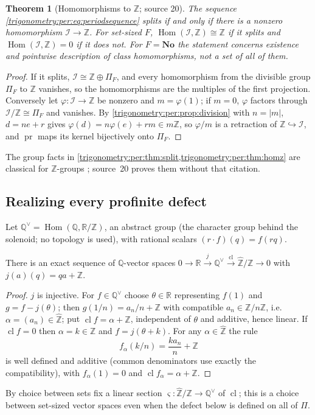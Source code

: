 \documentclass[11pt,letterpaper]{article}
\numberwithin{equation}{section}
\newtheorem{theorem}{Theorem}[section]
\theoremstyle{definition}
\theoremstyle{remark}
\newcommand{\No}{\mathbf{No}}
\newcommand{\R}{\mathbb R}
\newcommand{\Q}{\mathbb Q}
\newcommand{\Z}{\mathbb Z}
\newcommand{\Hom}{\operatorname{Hom}}
\newcommand{\pr}{\operatorname{pr}}
\newcommand{\cl}{\operatorname{cl}}
\newcommand{\Zhat}{\widehat{\Z}}
\newcommand{\Qv}{\Q^{\vee}}
\newcommand{\cI}{\mathcal I}
\begin{document}
\begin{theorem}[Homomorphisms to $\Z$; source 20]\label{trigonometry:per:thm:homz}
The sequence \eqref{trigonometry:per:eq:periodsequence} splits if and only if there is a nonzero
homomorphism $\cI\to\Z$. For set-sized $F$, $\Hom(\cI,\Z)\cong\Z$ if it splits and $\Hom(\cI,\Z)=0$ if
it does not. For $F=\No$ the statement concerns existence and pointwise description of class
homomorphisms, not a set of all of them.
\end{theorem}
\begin{proof}
If it splits, $\cI\cong\Z\oplus\Pi_F$, and every homomorphism from the divisible group $\Pi_F$ to $\Z$
vanishes, so the homomorphisms are the multiples of the first projection. Conversely let
$\varphi:\cI\to\Z$ be nonzero and $m=\varphi(1)$; if $m=0$, $\varphi$ factors through
$\cI/\Z\cong\Pi_F$ and vanishes. By \cref{trigonometry:per:prop:division} with $n=|m|$, $d=ne+r$
gives $\varphi(d)=n\varphi(e)+rm\in m\Z$, so $\varphi/m$ is a retraction of $\Z\hookrightarrow\cI$, and
$\pr$ maps its kernel bijectively onto $\Pi_F$.
\end{proof}
The group facts in \cref{trigonometry:per:thm:split,trigonometry:per:thm:homz} are classical for
$\Z$-groups \cite[\S\S2--4]{Jerabek}; source~20 proves them without that citation.

\subsection{Realizing every profinite defect}\label{trigonometry:per:sec:realize}
Let $\Qv=\Hom(\Q,\R/\Z)$, an abstract group (the character group behind the solenoid; no topology is
used), with rational scalars $(r\cdot f)(q)=f(rq)$.

\begin{lemma}\label{trigonometry:per:lem:solenoid}
There is an exact sequence of $\Q$-vector spaces
$0\to\R\xrightarrow{j}\Qv\xrightarrow{\cl}\Zhat/\Z\to0$ with $j(a)(q)=qa+\Z$.
\end{lemma}
\begin{proof}
$j$ is injective. For $f\in\Qv$ choose $\theta\in\R$ representing $f(1)$ and $g=f-j(\theta)$; then
$g(1/n)=a_n/n+\Z$ with compatible $a_n\in\Z/n\Z$, i.e.\ $\alpha=(a_n)\in\Zhat$; put $\cl f=\alpha+\Z$,
independent of $\theta$ and additive, hence linear. If $\cl f=0$ then $\alpha=k\in\Z$ and
$f=j(\theta+k)$. For any $\alpha\in\Zhat$ the rule
\begin{equation}\label{trigonometry:per:eq:falpha}
 f_\alpha(k/n)=\frac{ka_n}{n}+\Z
\end{equation}
is well defined and additive (common denominators use exactly the compatibility), with $f_\alpha(1)=0$
and $\cl f_\alpha=\alpha+\Z$.
\end{proof}
By choice between sets fix a linear section $\varsigma:\Zhat/\Z\to\Qv$ of $\cl$; this is a choice
between set-sized vector spaces even when the defect below is defined on all of $\Pi$.
\end{document}

